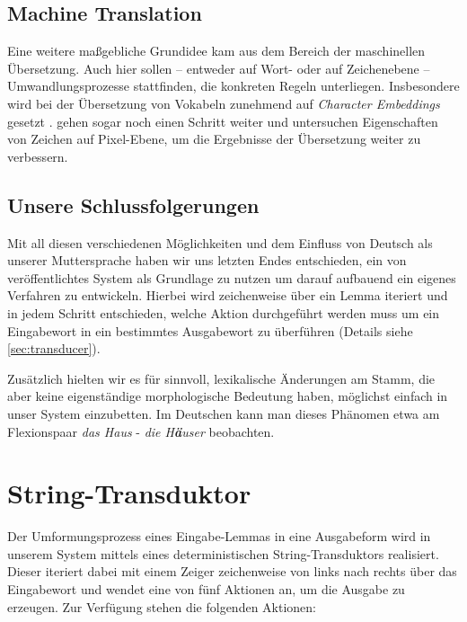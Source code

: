 \documentclass[11pt,a4paper]{article}
\begin{document}
\subsection{Machine Translation}
Eine weitere maßgebliche Grundidee kam aus dem Bereich der maschinellen Übersetzung. Auch hier sollen -- entweder auf Wort- oder auf Zeichenebene -- Umwandlungsprozesse stattfinden, die konkreten Regeln unterliegen.
Insbesondere wird bei der Übersetzung von Vokabeln zunehmend auf \textit{Character Embeddings} gesetzt \citep{charMT1, charMT2, charMT3, charMT4, charMT5}.
\citet{cjk-mt:LiuLLN17} gehen sogar noch einen Schritt weiter und untersuchen Eigenschaften von Zeichen auf Pixel-Ebene, um die Ergebnisse der Übersetzung weiter zu verbessern.

\subsection{Unsere Schlussfolgerungen}
Mit all diesen verschiedenen Möglichkeiten und dem Einfluss von Deutsch als unserer Muttersprache haben wir uns letzten Endes entschieden, ein von \citet{cluzh:MakarovRC17} veröffentlichtes System als Grundlage zu nutzen um darauf aufbauend ein eigenes Verfahren zu entwickeln.
Hierbei wird zeichenweise über ein Lemma iteriert und in jedem Schritt entschieden, welche Aktion durchgeführt werden muss um ein Eingabewort in ein bestimmtes Ausgabewort zu überführen (Details siehe \autoref{sec:transducer}).

Zusätzlich hielten wir es für sinnvoll, lexikalische Änderungen am Stamm, die aber keine eigenständige morphologische Bedeutung haben, möglichst einfach in unser System einzubetten.
Im Deutschen kann man dieses Phänomen etwa am Flexionspaar \textit{das Haus} - \textit{die H\textbf{ä}user} beobachten.

\section{String-Transduktor}
\label{sec:transducer}

Der Umformungsprozess eines Eingabe-Lemmas in eine Ausgabeform wird in unserem System mittels eines deterministischen String-Transduktors realisiert. Dieser iteriert dabei mit einem Zeiger zeichenweise von links nach rechts über das Eingabewort und wendet eine von fünf Aktionen an, um die Ausgabe zu erzeugen. Zur Verfügung stehen die folgenden Aktionen:
\end{document}
